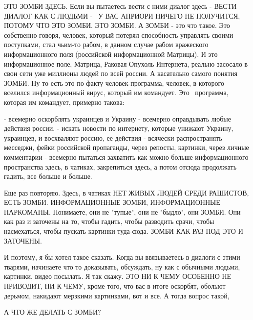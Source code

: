 ЭТО ЗОМБИ ЗДЕСЬ. Если вы пытаетесь вести с ними диалог здесь - ВЕСТИ ДИАЛОГ КАК
С ЛЮДЬМИ -  У ВАС АПРИОРИ НИЧЕГО НЕ ПОЛУЧИТСЯ, ПОТОМУ ЧТО ЭТО ЗОМБИ. ЭТО ЗОМБИ.
А ЗОМБИ - это что такое. Это собственно говоря, человек, который потерял
способность управлять своими поступками, стал чьим-то рабом, в данном случае
рабом вражеского информационного поля (российской информационной Матрицы). И
это информационное поле, Матрица, Раковая Опухоль Интернета, реально засосало в
свои сети уже миллионы людей по всей россии. А касательно самого понятия ЗОМБИ.
Ну то есть это по факту человек-программа, человек, в которого вселился
информационный вирус, который им командует. Это  программа, которая им
командует, примерно такова:

- всемерно оскорблять украинцев и Украину
- всемерно оправдывать любые действия россии, 
- искать новости по интернету, которые унижают Украину, украинцев, и восхваляют россию, ее действия
- всячески распространять месседжи, фейки российской пропаганды,
через репосты, картинки, через личные комментарии
- всемерно пытаться захватить как можно больше информационного пространства здесь, в чатиках, закрепиться здесь, а потом отсюда продолжать гадить, все больше и больше.

Еще раз повторяю. Здесь, в чатиках НЕТ ЖИВЫХ ЛЮДЕЙ СРЕДИ РАШИСТОВ, ЕСТЬ ЗОМБИ.
ИНФОРМАЦИОННЫЕ ЗОМБИ, ИНФОРМАЦИОННЫЕ НАРКОМАНЫ. Понимаете, они не "тупые", они
не "быдло", они ЗОМБИ. Они как раз и заточены на то, чтобы гадить, чтобы
разводить срачи, чтобы насмехаться, чтобы пускать картинки туда-сюда. ЗОМБИ КАК
РАЗ ПОД ЭТО И ЗАТОЧЕНЫ.

И поэтому, я бы хотел такое сказать. Когда вы ввязываетесь в диалоги с этими
тварями, начинаете что то доказывать, обсуждать, ну как с обычными людьми,
картинки, видео посылать. Я так скажу. ЭТО НИ К ЧЕМУ ОСОБЕННО НЕ ПРИВОДИТ, НИ К
ЧЕМУ, кроме того, что вас в итоге оскорбят, обольют дерьмом, накидают мерзкими
картинками, вот и все. А тогда вопрос такой,

А ЧТО ЖЕ ДЕЛАТЬ С ЗОМБИ?
